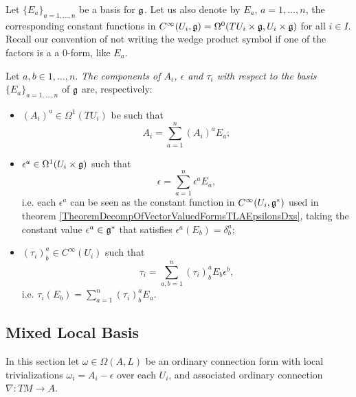 \lin

Let $\{E_a\}_{a = 1, \dots, n}$ be a basis for $\mathfrak{g}$. Let us also denote by $E_a$, $a = 1, \dots, n$, the corresponding constant functions in $C^\infty(U_i, \mathfrak{g}) = \Omega^0(TU_i \times \mathfrak{g}, U_i \times \mathfrak{g})$ for all $i \in I$. Recall our convention of not writing the wedge product symbol if one of the factors is a a $0$-form, like $E_a$.

\begin{definition}
    Let $a, b \in 1, \dots, n$. \emph{The components of $A_i$, $\epsilon$ and $\tau_i$ with respect to the basis $\{E_a\}_{a = 1, \dots, n}$} of $\mathfrak{g}$ are, respectively: 
    
        \begin{itemize}
        
        \item $(A_i)^a \in \Omega^1(TU_i)$ be such that
            \begin{equation}
                A_i = \sum_{a = 1}^n (A_i)^a E_a;
            \end{equation}
        
        \item $\epsilon^a \in \Omega^1(U_i \times \alg g)$ such that
            \begin{equation}
                \epsilon = \sum_{a = 1}^n \epsilon^a E_a,
            \end{equation}
        i.e. each $\epsilon^a$ can be seen as the constant function in $C^\infty(U_i, \mathfrak{g}^*)$ used in theorem \ref{TheoremDecompOfVectorValuedFormsTLAEpsilonsDxs}, taking the constant value $\epsilon^a \in \alg g^*$ that satisfies $\epsilon^a(E_b) = \delta^a_b$;
        
        \item $(\tau_i)^a_b \in C^\infty(U_i)$ such that
            \begin{equation}
                \tau_i = \sum_{a, b = 1}^n (\tau_i)^a_b E_b \epsilon^b,
            \end{equation}
        i.e. $\tau_i(E_b) = \sum_{a = 1}^n (\tau_i)^a_b E_a$.
        \end{itemize}
\end{definition}



\subsection{Mixed Local Basis}
In this section let $\omega \in \Omega(A, L)$ be an ordinary connection form with local trivializations $\omega_i = A_i - \epsilon$ over each $U_i$, and associated ordinary connection $\nabla: TM \to A$.

